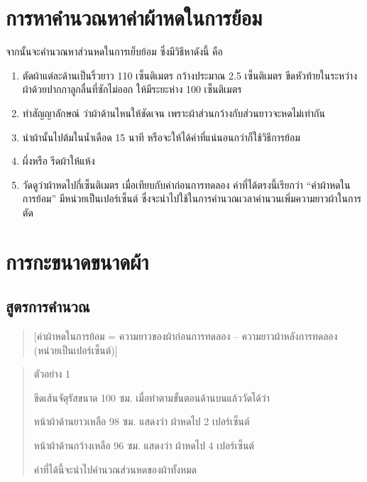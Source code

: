 \section{การหาคำนวณหาค่าผ้าหดในการย้อม}

จากนั้นจะคำนวณหาส่วนหดในการเย็บย้อม ซึ่งมีวิธีหาดังนี้ คือ

\begin{enumerate}
\def\labelenumi{(\arabic{enumi})}
\item
  ตัดผ้าแต่ละด้านเป็นริ้วยาว 110 เซ็นติเมตร กว้างประมาณ 2.5 เซ็นติเมตร
  ขีดหัวท้ายในระหว่างผ้าด้วยปากกาลูกลื่นที่ซักไม่ออก ให้มีระยะห่าง 100
  เซ็นติเมตร
\item
  ทำสัญญาลักษณ์ ว่าผ้าด้านไหนให้ชัดเจน
  เพราะผ้าส่วนกว้างกับส่วนยาวจะหดไม่เท่ากัน
\item
  นำผ้านั้นไปต้มในน้ำเดือด 15 นาที
  หรือจะให้ได้ค่าที่แน่นอนกว่าก็ใช้วิธีการย้อม
\item
  ผึ่งหรือ รีดผ้าให้แห้ง
\item
  วัดดูว่าผ้าหดไปกี่เซ็นติเมตร เมื่อเทียบกับค่าก่อนการทดลอง
  ค่าที่ได้ตรงนี้เรียกว่า ``ค่าผ้าหดในการย้อม'' มีหน่วยเป็นเปอร์เซ็นต์
  ซึ่งจะนำไปใช้ในการคำนวณเวลาคำนวนเพิ่มความยาวผ้าในการตัด
\end{enumerate}

\setlength{\nextPhotoWidth}{0.5\textwidth}



\clearpage

\section{การกะขนาดขนาดผ้า}

\subsection{สูตรการคำนวณ}

\begin{quote}
{[}ค่าผ้าหดในการย้อม = ความยาวของผ้าก่อนการทดลอง --
ความยาวผ้าหลังการทดลอง (หน่วยเป็นเปอร์เซ็นต์){]}
\end{quote}

\begin{quote}
ตัวอย่าง 1

ขีดเส้นจัตุรัสขนาด 100 ซม. เมื่อทำตามขั้นตอนด้านบนแล้ววัดได้ว่า

หน้าผ้าด้านยาวเหลือ 98 ซม. แสดงว่า ผ้าหดไป 2 เปอร์เซ็นต์

หน้าผ้าด้านกว้างเหลือ 96 ซม. แสดงว่า ผ้าหดไป 4 เปอร์เซ็นต์

ค่าที่ได้นี้จะนำไปคำนวณส่วนหดของผ้าทั้งหมด
\end{quote}

